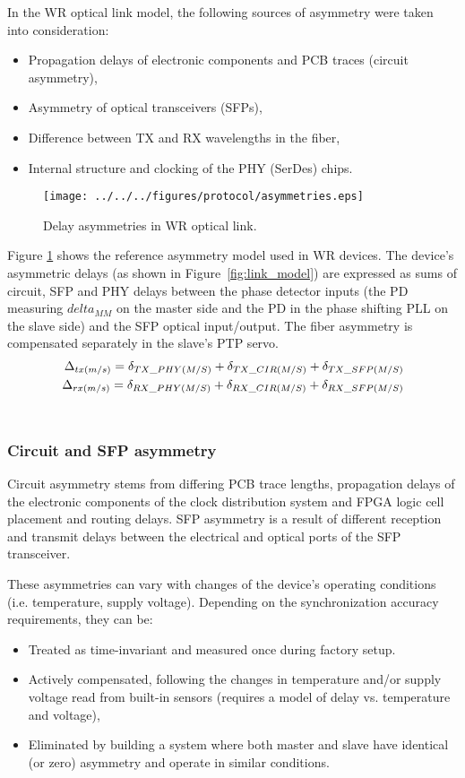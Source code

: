 In the WR optical link model, the following sources of asymmetry were taken
into consideration:
\begin {itemize}
\item Propagation delays of electronic components and PCB traces (circuit
asymmetry),
\item Asymmetry of optical transceivers (SFPs),
\item Difference between TX and RX wavelengths in the fiber,
\item Internal structure and clocking of the PHY (SerDes) chips.
\end{itemize}
\begin{figure}[ht!]
  \centering
  \texttt{[image: ../../../figures/protocol/asymmetries.eps]}
  \caption{Delay asymmetries in WR optical link.}
  \label{fig:asymmetries}
\end{figure}
Figure \ref{fig:asymmetries} shows the reference asymmetry model used in WR
devices. The device's asymmetric delays (as shown in Figure~\ref{fig:link_model})
are expressed as sums of circuit, SFP and PHY delays between the phase detector
inputs (the PD measuring $delta_{MM}$ on the master side and the PD in the
phase shifting PLL on the slave side) and the SFP optical input/output. The
fiber asymmetry is compensated separately in the slave's PTP servo.
\begin{eqnarray}
\Delta_{tx(m/s)} = \delta_{TX\us PHY(M/S)} + \delta_{TX\us CIR(M/S)} +
\delta_{TX\us SFP(M/S)}
\\
\Delta_{rx(m/s)} = \delta_{RX\us PHY(M/S)} + \delta_{RX\us CIR(M/S)} +
\delta_{RX\us SFP(M/S)} \nonumber
\label{eq:asym_delay}
\end{eqnarray}\\

\subsubsection{Circuit and SFP asymmetry}
Circuit asymmetry stems from differing PCB trace lengths, propagation delays
of the electronic components of the clock distribution system and FPGA logic
cell placement and routing delays. SFP asymmetry is a result of different
reception and transmit delays between the electrical and optical ports of
the SFP transceiver.

These asymmetries can vary with changes of the device's operating conditions
(i.e. temperature, supply voltage). Depending on the synchronization accuracy
requirements, they can be:
\begin{itemize}
\item Treated as time-invariant and measured once during factory setup.
\item Actively compensated, following the changes in temperature and/or supply
voltage read from built-in sensors (requires a model of delay vs. temperature
and voltage),
\item Eliminated by building a system where both master and slave have
identical (or zero) asymmetry and operate in similar conditions.
\end{itemize}

